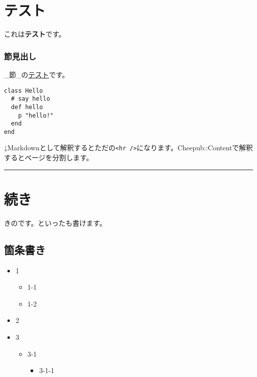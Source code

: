 \chapter*{テスト}\hypertarget{テスト}{}\label{テスト}

これは\textbf{テスト}です。

\subsection*{節見出し}\hypertarget{節見出し}{}\label{節見出し}

\_節\_の\href{https://example.jp/}{テスト}です。

\begin{verbatim}class Hello
  # say hello
  def hello
    p "hello!"
  end
end
\end{verbatim}



↓Markdownとして解釈するとただの\texttt{\textless{}hr /\textgreater{}}になります。Cheepub::Contentで解釈するとページを分割します。

\begin{center}
\rule{3in}{0.4pt}
\end{center}

\chapter*{続き}\hypertarget{続き}{}\label{続き}

きのです。といったも書けます。

\section*{箇条書き}\hypertarget{箇条書き}{}\label{箇条書き}

\begin{itemize}
\item{} 1


\begin{itemize}
\item{} 1-1
\item{} 1-2
\end{itemize}
\item{} 2
\item{} 3


\begin{itemize}
\item{} 3-1


\begin{itemize}
\item{} 3-1-1
\end{itemize}
\end{itemize}
\end{itemize}

